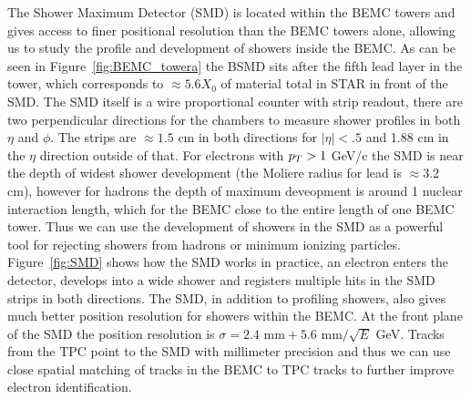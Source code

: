 The Shower Maximum Detector (SMD) is located within the BEMC towers and gives access to finer positional resolution than the BEMC towers alone, allowing us to study the profile and development of showers inside the BEMC. As can be seen in Figure~\ref{fig:BEMC_towera} the BSMD sits after the fifth lead layer in the tower, which corresponds to $\approx 5.6 X_{0}$ of material total in STAR in front of the SMD. The SMD itself is a wire proportional counter with strip readout, there are two perpendicular directions for the chambers to measure shower profiles in both $\eta$ and $\phi$. The strips are $\approx 1.5$ cm in both directions for $|\eta| < .5$ and 1.88 cm in the $\eta$ direction outside of that. For electrons with $p_{T} > 1$ GeV/c the SMD is near the depth of widest shower development (the Moliere radius for lead is $\approx 3.2$ cm), however for hadrons the depth of maximum deveopment is around 1 nuclear interaction length, which for the BEMC close to the entire length of one BEMC tower. Thus we can use the development of showers in the SMD as a powerful tool for rejecting showers from hadrons or minimum ionizing particles. Figure~\ref{fig:SMD} shows how the SMD works in practice, an electron enters the detector, develops into a wide shower and registers multiple hits in the SMD strips in both directions. The SMD, in addition to profiling showers, also gives much better position resolution for showers within the BEMC. At the front plane of the SMD the position resolution is $\sigma = 2.4 \text{ mm} + 5.6 \text{ mm}/\sqrt{E}$ GeV. Tracks from the TPC point to the SMD with millimeter precision and thus we can use close spatial matching of tracks in the BEMC to TPC tracks to further improve electron identification.

